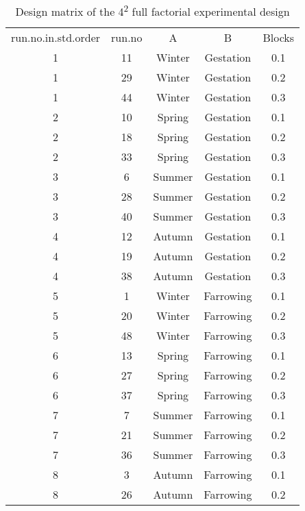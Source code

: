 \begin{table}[]
\centering
\caption{Design matrix of the 4\textsuperscript{2} full factorial experimental design}
\label{my-label}
\begin{tabular}{ccccc}
run.no.in.std.order & run.no & A      & B         & Blocks \\
1                   & 11     & Winter & Gestation & 0.1    \\
1                   & 29     & Winter & Gestation & 0.2    \\
1                   & 44     & Winter & Gestation & 0.3    \\
2                   & 10     & Spring & Gestation & 0.1    \\
2                   & 18     & Spring & Gestation & 0.2    \\
2                   & 33     & Spring & Gestation & 0.3    \\
3                   & 6      & Summer & Gestation & 0.1    \\
3                   & 28     & Summer & Gestation & 0.2    \\
3                   & 40     & Summer & Gestation & 0.3    \\
4                   & 12     & Autumn & Gestation & 0.1    \\
4                   & 19     & Autumn & Gestation & 0.2    \\
4                   & 38     & Autumn & Gestation & 0.3    \\
5                   & 1      & Winter & Farrowing & 0.1    \\
5                   & 20     & Winter & Farrowing & 0.2    \\
5                   & 48     & Winter & Farrowing & 0.3    \\
6                   & 13     & Spring & Farrowing & 0.1    \\
6                   & 27     & Spring & Farrowing & 0.2    \\
6                   & 37     & Spring & Farrowing & 0.3    \\
7                   & 7      & Summer & Farrowing & 0.1    \\
7                   & 21     & Summer & Farrowing & 0.2    \\
7                   & 36     & Summer & Farrowing & 0.3    \\
8                   & 3      & Autumn & Farrowing & 0.1    \\
8                   & 26     & Autumn & Farrowing & 0.2    \\

\end{tabular}
\end{table}
